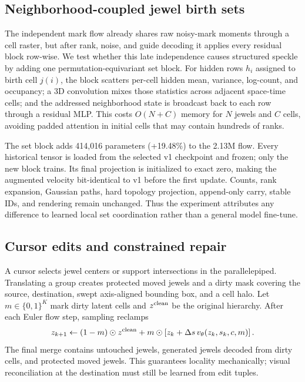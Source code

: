 \documentclass[10pt]{article}
\begin{document}
\subsection{Neighborhood-coupled jewel birth sets}

The independent mark flow already shares raw noisy-mark moments through a cell raster, but after
rank, noise, and guide decoding it applies every residual block row-wise. We test whether this
late independence causes structured speckle by adding one permutation-equivariant set block. For
hidden rows $h_i$ assigned to birth cell $j(i)$, the block scatters per-cell hidden mean, variance,
log-count, and occupancy; a 3D convolution mixes those statistics across adjacent space-time
cells; and the addressed neighborhood state is broadcast back to each row through a residual MLP.
This costs $O(N+C)$ memory for $N$ jewels and $C$ cells, avoiding padded attention in initial cells
that may contain hundreds of ranks.

The set block adds 414,016 parameters (+19.48\%) to the 2.13M flow. Every historical tensor is
loaded from the selected v1 checkpoint and frozen; only the new block trains. Its final projection
is initialized to exact zero, making the augmented velocity bit-identical to v1 before the first
update. Counts, rank expansion, Gaussian paths, hard topology projection, append-only carry,
stable IDs, and rendering remain unchanged. Thus the experiment attributes any difference to
learned local set coordination rather than a general model fine-tune.

\subsection{Cursor edits and constrained repair}

A cursor selects jewel centers or support intersections in the parallelepiped. Translating a group
creates protected moved jewels and a dirty mask covering the source, destination, swept axis-aligned
bounding box, and a cell halo. Let $m\in\{0,1\}^{K}$ mark dirty latent cells and $z^{\rm clean}$ be
the original hierarchy. After each Euler flow step, sampling reclamps
\begin{equation}
z_{k+1}\leftarrow (1-m)\odot z^{\rm clean}+m\odot
\left[z_k+\Delta s\,v_\theta(z_k,s_k,c,m)\right].
\label{eq:clamp}
\end{equation}
The final merge contains untouched jewels, generated jewels decoded from dirty cells, and protected
moved jewels. This guarantees locality mechanically; visual reconciliation at the destination must
still be learned from edit tuples.
\end{document}
